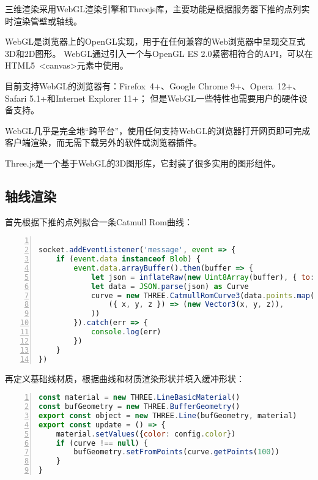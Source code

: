 三维渲染采用WebGL渲染引擎和Threejs库，主要功能是根据服务器下推的点列实时渲染管壁或轴线。

WebGL是浏览器上的OpenGL实现，用于在任何兼容的Web浏览器中呈现交互式3D和2D图形\cite{webgl}。
WebGL通过引入一个与OpenGL ES 2.0紧密相符合的API，可以在HTML5 <canvas>元素中使用。

目前支持WebGL的浏览器有：Firefox 4+、Google Chrome 9+、Opera 12+、Safari 5.1+和Internet Explorer 11+；
但是WebGL一些特性也需要用户的硬件设备支持。

WebGL几乎是完全地“跨平台”，使用任何支持WebGL的浏览器打开网页即可完成客户端渲染，而无需下载另外的软件或浏览器插件。

Three.js是一个基于WebGL的3D图形库\cite{threejs}，它封装了很多实用的图形组件。

\subsection{轴线渲染}

首先根据下推的点列拟合一条Catmull Rom曲线：

\begin{lstlisting}[language=JavaScript,
   backgroundcolor=\color{lightgray},
   extendedchars=true,
   basicstyle=\footnotesize\ttfamily,
   showstringspaces=false,
   showspaces=false,
   numbers=left,
   numberstyle=\footnotesize,
   numbersep=9pt,
   tabsize=2,
   breaklines=true,
   showtabs=false,
   captionpos=b]

socket.addEventListener('message', event => {
    if (event.data instanceof Blob) {
        event.data.arrayBuffer().then(buffer => {
            let json = inflateRaw(new Uint8Array(buffer), { to: 'string' })
            let data = JSON.parse(json) as Curve
            curve = new THREE.CatmullRomCurve3(data.points.map(
                ({ x, y, z }) => (new Vector3(x, y, z)),
            ))
        }).catch(err => {
            console.log(err)
        })
    }
})
\end{lstlisting}

再定义基础线材质，根据曲线和材质渲染形状并填入缓冲形状：

\begin{lstlisting}[language=JavaScript,
   backgroundcolor=\color{lightgray},
   extendedchars=true,
   basicstyle=\footnotesize\ttfamily,
   showstringspaces=false,
   showspaces=false,
   numbers=left,
   numberstyle=\footnotesize,
   numbersep=9pt,
   tabsize=2,
   breaklines=true,
   showtabs=false,
   captionpos=b]
const material = new THREE.LineBasicMaterial()
const bufGeometry = new THREE.BufferGeometry()
export const object = new THREE.Line(bufGeometry, material)
export const update = () => {
    material.setValues({color: config.color})
    if (curve !== null) {
        bufGeometry.setFromPoints(curve.getPoints(100))
    }
}
\end{lstlisting}

